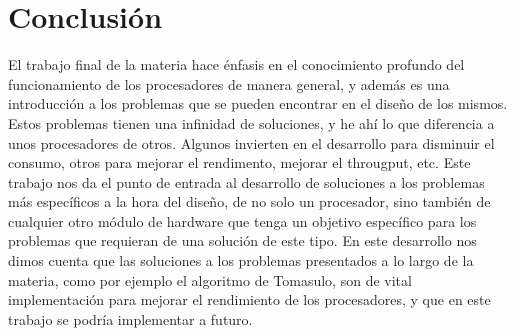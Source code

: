\newpage
\section{Conclusi\'on}
El trabajo final de la materia hace \'enfasis en el conocimiento profundo del funcionamiento de los procesadores de manera general, y adem\'as es una introducci\'on a los problemas que se pueden encontrar en el diseño de los mismos. 
Estos problemas tienen una infinidad de soluciones, y he ah\'i lo que diferencia a unos procesadores de otros. Algunos invierten en el desarrollo para disminuir el consumo, otros para mejorar el rendimento, mejorar el througput, etc. 
Este trabajo nos da el punto de entrada al desarrollo de soluciones a los problemas m\'as espec\'ificos a la hora del diseño, de no solo un procesador, sino tambi\'en de cualquier otro m\'odulo de hardware que tenga un objetivo espec\'ifico para los problemas que requieran de una soluci\'on de este tipo. En este desarrollo nos dimos cuenta que las soluciones a los problemas presentados a lo largo de la materia, como por ejemplo el algoritmo de Tomasulo, son de vital implementaci\'on para mejorar el rendimiento de los procesadores, y que en este trabajo se podr\'ia implementar a futuro.  